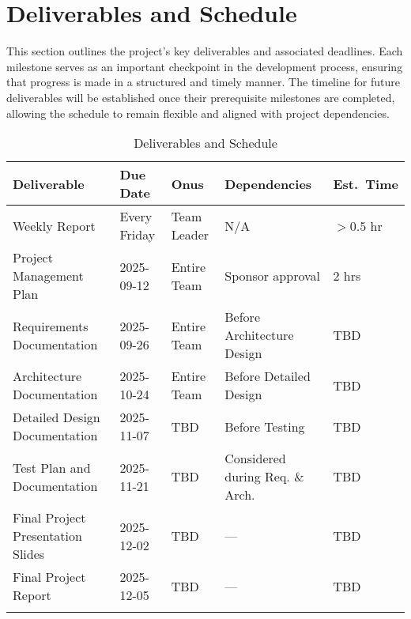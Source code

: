 \section{Deliverables and Schedule}

This section outlines the project’s key deliverables and associated deadlines. Each milestone serves as an important checkpoint in the development process, ensuring that progress is made in a structured and timely manner. The timeline for future deliverables will be established once their prerequisite milestones are completed, allowing the schedule to remain flexible and aligned with project dependencies.

\begingroup
    \small
    \setlength{\LTpre}{0pt}
    \setlength{\LTpost}{0pt}
    \begin{longtable}{p{3.2cm}<{\raggedright} p{2.2cm}<{\raggedright} p{2.2cm}<{\raggedright} p{3.2cm}<{\raggedright} p{2cm}<{\raggedright}}
        \caption{Deliverables and Schedule}\label{tab:deliverables}\\
        \hline
        \textbf{Deliverable} & \textbf{Due Date} & \textbf{Onus} & \textbf{Dependencies} & \textbf{Est.\ Time} \\
        \hline
    
        \arrayrulecolor{gray!30}
        Weekly Report                       & Every Friday  & Team Leader   & N/A                               & $>0.5$ hr \\
        \hline
        Project Management Plan             & 2025-09-12    & Entire Team   & Sponsor approval                  & 2 hrs \\
        \hline
        Requirements Documentation          & 2025-09-26    & Entire Team   & Before Architecture Design        & TBD \\
        \hline
        Architecture Documentation          & 2025-10-24    & Entire Team   & Before Detailed Design            & TBD \\
        \hline
        Detailed Design Documentation       & 2025-11-07    & TBD           & Before Testing                    & TBD \\
        \hline
        Test Plan and Documentation         & 2025-11-21    & TBD           & Considered during Req. \& Arch.   & TBD \\
        \hline
        Final Project Presentation Slides   & 2025-12-02    & TBD           & ---                               & TBD \\
        \hline
        Final Project Report                & 2025-12-05    & TBD           & ---                               & TBD \\
        \arrayrulecolor{black}
        \hline
\end{longtable}

\endgroup